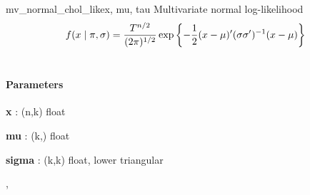 \begin{funcdesc}{mv\_normal\_chol\_like}{x, mu, tau}
\hypertarget{pymc.distributions.mv_normal_chol_like}{}
Multivariate normal log-likelihood
\begin{gather}
\begin{split}f(x \mid \pi, \sigma) = \frac{T^{n/2}}{(2\pi)^{1/2}} \exp\left\{ -\frac{1}{2} (x-\mu)^{\prime}(\sigma \sigma^{\prime})^{-1}(x-\mu) \right\}\end{split}\notag\\\begin{split}\end{split}\notag
\end{gather}\paragraph{Parameters}\begin{paramlist}

\item[] \textbf{x} : (n,k) float

\item[] \textbf{mu} : (k,) float

\item[] \textbf{sigma} : (k,k) float, lower triangular
\end{paramlist}



\hyperlink{pymc.distributions.mv_normal_like}{}, \hyperlink{pymc.distributions.mv_normal_cov_like}{}


\end{funcdesc}


